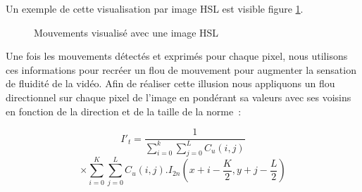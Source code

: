 \documentclass[fleqn,10pt]{SelfArx} %
\begin{document}
Un exemple de cette visualisation par image HSL est visible figure \ref{hsl}.
\begin{figure}[!ht]%
    \centering
    \hspace{0.030\textwidth}
    \hspace{0.030\textwidth}
    \caption{Mouvements visualisé avec une image HSL}
    \label{hsl}
\end{figure}

Une fois les mouvements détectés et exprimés pour chaque pixel, nous utilisons ces informations pour recréer
un flou de mouvement pour augmenter la sensation de fluidité de la vidéo.
Afin de réaliser cette illusion nous appliquons un flou directionnel sur chaque pixel de l'image en pondérant
sa valeurs avec ses voisins en fonction de la direction et de la taille de la norme~:

\[
	I'_{t} = \frac{1}{\sum^{k}_{i=0}\sum^{L}_{j=0}C_{u}(i,j)}
\]
\[
	\times \sum^{K}_{i=0}\sum^{L}_{j=0} C_{u}(i,j).I_{2n}(x+i-\frac{K}{2}, y+j-\frac{L}{2})
\]
\end{document}
